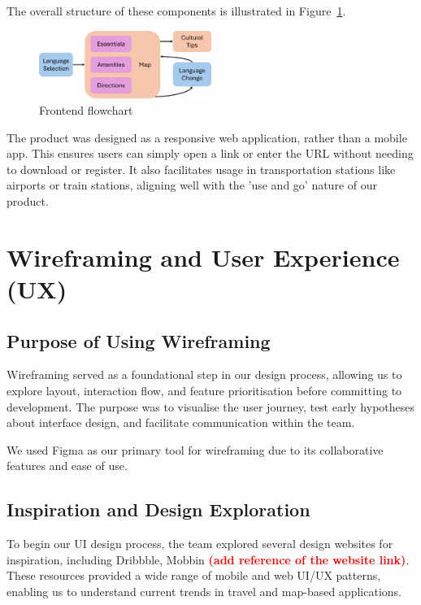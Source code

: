 The overall structure of these components is illustrated in Figure~\ref{fig:frontend-flowchart}.

\begin{figure}[H] 
    \centering 
    \includegraphics[width=0.5\textwidth]{images/Frontend/Frontend_Flowchart.png} 
    \caption{Frontend flowchart} 
    \label{fig:frontend-flowchart} 
\end{figure} 

The product was designed as a responsive web application, rather than a mobile app. This ensures users can simply open a link or enter the URL without needing to download or register. It also facilitates usage in transportation stations like airports or train stations, aligning well with the 'use and go' nature of our product.

\section{Wireframing and User Experience (UX)}

\subsection{Purpose of Using Wireframing}
Wireframing served as a foundational step in our design process, allowing us to explore layout, interaction flow, and feature prioritisation before committing to development. The purpose was to visualise the user journey, test early hypotheses about interface design, and facilitate communication within the team.

We used Figma as our primary tool for wireframing due to its collaborative features and ease of use.

\subsection{Inspiration and Design Exploration}
To begin our UI design process, the team explored several design websites for inspiration, including Dribbble, Mobbin \textbf{\textcolor{red}{(add reference of the website link)}}. These resources provided a wide range of mobile and web UI/UX patterns, enabling us to understand current trends in travel and map-based applications.

